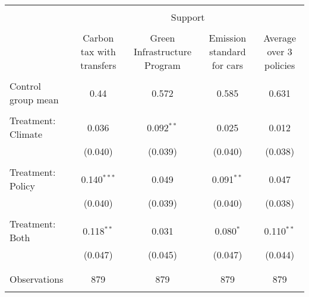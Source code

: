 
\begin{tabular}{@{\extracolsep{5pt}}lcccc} 
\\[-1.8ex]\hline 
\hline \\[-1.8ex] 
 & \multicolumn{4}{c}{Support} \\ 
\cline{2-5} 
\\[-1.8ex] & Carbon tax with transfers & Green Infrastructure Program & Emission standard for cars & Average over 3 policies \\ 
\hline \\[-1.8ex] 
 Control group mean & 0.44 & 0.572 & 0.585 & 0.631  \\ \hline \\[-1.8ex] Treatment: Climate & 0.036 & 0.092$^{**}$ & 0.025 & 0.012 \\ 
  & (0.040) & (0.039) & (0.040) & (0.038) \\ 
  & & & & \\ 
 Treatment: Policy & 0.140$^{***}$ & 0.049 & 0.091$^{**}$ & 0.047 \\ 
  & (0.040) & (0.039) & (0.040) & (0.038) \\ 
  & & & & \\ 
 Treatment: Both & 0.118$^{**}$ & 0.031 & 0.080$^{*}$ & 0.110$^{**}$ \\ 
  & (0.047) & (0.045) & (0.047) & (0.044) \\ 
  & & & & \\ 
\hline \\[-1.8ex] 

Observations & 879 & 879 & 879 & 879 \\ 
\hline 
\hline \\[-1.8ex] 
\end{tabular} 